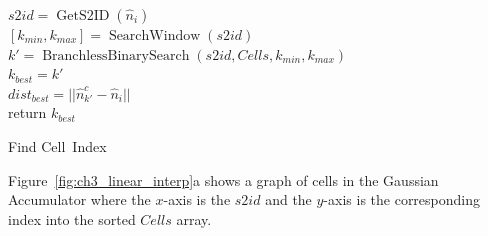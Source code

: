 \begin{algorithm}[ht]
    \SetStartEndCondition{ }{}{}%

    
    $s2id = \operatorname{GetS2ID}(\hat{n}_i)$ \\
    $[k_{min}, k_{max}] = \operatorname{SearchWindow}(s2id) $\\
    $k' = \operatorname{BranchlessBinarySearch}(s2id, Cells, k_{min}, k_{max})$\\
    $k_{best} = k'$\\
    $dist_{best} = ||\hat{n}^c_{k'}-\hat{n}_i  ||$ \\
    return $k_{best}$
    \caption{Find Cell~Index}
    \label{alg:ch3_find_cell_index}
\end{algorithm}
\vspace{6pt}
Figure~\ref{fig:ch3_linear_interp}a shows a graph of cells in the Gaussian Accumulator where the $x$-axis is the $s2id$ and the $y$-axis is the corresponding index into the sorted $Cells$ array. %
